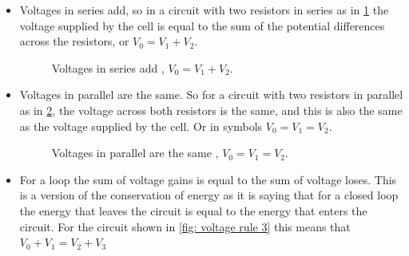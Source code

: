 \begin{itemize}
\setlength{\itemsep}{-5pt}
    \item[1)] Voltages in series add, so in a circuit with two resistors in series as in \cref{fig: voltage rule 1} the voltage supplied by the cell is equal to the sum of the potential differences across the resistors, or $V_{0}=V_{1}+V_{2}$.
     \begin{figure}[ht]
    \centering
    \caption{Voltages in series add , $V_{0}=V_{1}+V_{2}$.}
    \label{fig: voltage rule 1}
\end{figure}
    \item[2)] Voltages in parallel are the same. So for a circuit with two resistors in parallel as in \cref{fig: voltage rule 2}, the voltage across both resistors is the same, and this is also the same as the voltage supplied by the cell. Or in symbols $V_{0}=V_{1}=V_{2}$.
    \begin{figure}[ht]
    \centering
    \caption{Voltages in parallel are the same , $V_{0}=V_{1}=V_{2}$.}
    \label{fig: voltage rule 2}
\end{figure}
    \item[3)] For a loop the sum of voltage gains is equal to the sum of voltage loses. This is a version of the conservation of energy as it is saying that for a closed loop the energy that leaves the circuit is equal to the energy that enters the circuit. For the circuit shown in \cref{fig: voltage rule 3} this means that $V_{0}+V_{1}=V_{2}+V_{3}$
       \begin{figure}[ht]

\end{figure}
\end{itemize}
